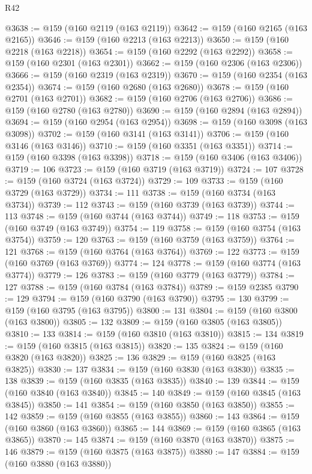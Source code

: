 \begin{lexlean}{R42}
\begin{coremodule}
@3638 := @159 (@160 @2119 (@163 @2119))
@3642 := @159 (@160 @2165 (@163 @2165))
@3646 := @159 (@160 @2213 (@163 @2213))
@3650 := @159 (@160 @2218 (@163 @2218))
@3654 := @159 (@160 @2292 (@163 @2292))
@3658 := @159 (@160 @2301 (@163 @2301))
@3662 := @159 (@160 @2306 (@163 @2306))
@3666 := @159 (@160 @2319 (@163 @2319))
@3670 := @159 (@160 @2354 (@163 @2354))
@3674 := @159 (@160 @2680 (@163 @2680))
@3678 := @159 (@160 @2701 (@163 @2701))
@3682 := @159 (@160 @2706 (@163 @2706))
@3686 := @159 (@160 @2780 (@163 @2780))
@3690 := @159 (@160 @2894 (@163 @2894))
@3694 := @159 (@160 @2954 (@163 @2954))
@3698 := @159 (@160 @3098 (@163 @3098))
@3702 := @159 (@160 @3141 (@163 @3141))
@3706 := @159 (@160 @3146 (@163 @3146))
@3710 := @159 (@160 @3351 (@163 @3351))
@3714 := @159 (@160 @3398 (@163 @3398))
@3718 := @159 (@160 @3406 (@163 @3406))
@3719 := 106
@3723 := @159 (@160 @3719 (@163 @3719))
@3724 := 107
@3728 := @159 (@160 @3724 (@163 @3724))
@3729 := 109
@3733 := @159 (@160 @3729 (@163 @3729))
@3734 := 111
@3738 := @159 (@160 @3734 (@163 @3734))
@3739 := 112
@3743 := @159 (@160 @3739 (@163 @3739))
@3744 := 113
@3748 := @159 (@160 @3744 (@163 @3744))
@3749 := 118
@3753 := @159 (@160 @3749 (@163 @3749))
@3754 := 119
@3758 := @159 (@160 @3754 (@163 @3754))
@3759 := 120
@3763 := @159 (@160 @3759 (@163 @3759))
@3764 := 121
@3768 := @159 (@160 @3764 (@163 @3764))
@3769 := 122
@3773 := @159 (@160 @3769 (@163 @3769))
@3774 := 124
@3778 := @159 (@160 @3774 (@163 @3774))
@3779 := 126
@3783 := @159 (@160 @3779 (@163 @3779))
@3784 := 127
@3788 := @159 (@160 @3784 (@163 @3784))
@3789 := @159 @2385
@3790 := 129
@3794 := @159 (@160 @3790 (@163 @3790))
@3795 := 130
@3799 := @159 (@160 @3795 (@163 @3795))
@3800 := 131
@3804 := @159 (@160 @3800 (@163 @3800))
@3805 := 132
@3809 := @159 (@160 @3805 (@163 @3805))
@3810 := 133
@3814 := @159 (@160 @3810 (@163 @3810))
@3815 := 134
@3819 := @159 (@160 @3815 (@163 @3815))
@3820 := 135
@3824 := @159 (@160 @3820 (@163 @3820))
@3825 := 136
@3829 := @159 (@160 @3825 (@163 @3825))
@3830 := 137
@3834 := @159 (@160 @3830 (@163 @3830))
@3835 := 138
@3839 := @159 (@160 @3835 (@163 @3835))
@3840 := 139
@3844 := @159 (@160 @3840 (@163 @3840))
@3845 := 140
@3849 := @159 (@160 @3845 (@163 @3845))
@3850 := 141
@3854 := @159 (@160 @3850 (@163 @3850))
@3855 := 142
@3859 := @159 (@160 @3855 (@163 @3855))
@3860 := 143
@3864 := @159 (@160 @3860 (@163 @3860))
@3865 := 144
@3869 := @159 (@160 @3865 (@163 @3865))
@3870 := 145
@3874 := @159 (@160 @3870 (@163 @3870))
@3875 := 146
@3879 := @159 (@160 @3875 (@163 @3875))
@3880 := 147
@3884 := @159 (@160 @3880 (@163 @3880))

\end{coremodule}
\end{lexlean}
